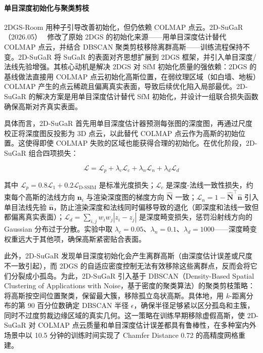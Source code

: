 \paragraph{单目深度初始化与聚类剪枝}

2DGS-Room 用种子引导改善初始化，但仍依赖 COLMAP 点云。2D-SuGaR（2026.05）~\cite{2605_00569} 修改了原始 2DGS 的初始化来源——用单目深度估计替代 COLMAP 点云，并结合 DBSCAN 聚类剪枝移除离群高斯——训练流程保持不变。2D-SuGaR 将 SuGaR 的表面对齐思想扩展到 2DGS 框架，并引入单目深度/法线先验增强。其核心动机是解决 2DGS 对 SfM 初始化质量的强依赖：2DGS 的基线做法直接用 COLMAP 点云初始化高斯位置，在弱纹理区域（如白墙、地板）COLMAP 产生的点云稀疏且偏离真实表面，导致后续优化陷入局部最优。2D-SuGaR 的解决方案是用单目深度估计替代 SfM 初始化，并设计一组联合损失函数确保高斯对齐真实表面。

具体而言，2D-SuGaR 首先用单目深度估计器预测每张图的深度图，再通过尺度校正将深度图反投影为 3D 点云，以此替代 COLMAP 点云作为高斯的初始位置。这使得即使 COLMAP 失败的区域也能获得合理的初始化。在优化阶段，2D-SuGaR 组合四项损失：

\begin{equation}
    \mathcal{L} = \mathcal{L}_p + \lambda_c \mathcal{L}_c + \lambda_n \mathcal{L}_n + \lambda_d \mathcal{L}_d
\end{equation}

其中 $\mathcal{L}_p = 0.8 \mathcal{L}_1 + 0.2 \mathcal{L}_{\text{D-SSIM}}$ 是标准光度损失；$\mathcal{L}_c$ 是深度-法线一致性损失，约束每个高斯的法线方向 $\mathbf{n}_i$ 与渲染深度图的梯度方向 $\hat{\mathbf{N}}$ 一致；$\mathcal{L}_n = 1 - \hat{\mathbf{N}}^\top \hat{\mathbf{n}}$ 引入单目法线先验 $\hat{\mathbf{n}}$，防止渲染深度和法线同时偏移导致的退化（即深度和法线一致但都偏离真实表面）；$\mathcal{L}_d = \sum_{i,j} w_i w_j |z_i - z_j|$ 是深度畸变损失，惩罚沿射线方向的 Gaussian 分布过于分散。实验中取 $\lambda_c = 0.05$、$\lambda_n = 0.1$、$\lambda_d = 1000$——深度畸变权重远大于其他项，确保高斯紧密贴合表面。

此外，2D-SuGaR 发现单目深度初始化会产生离群高斯（由深度估计误差或尺度不一致引起），而 2DGS 的自适应密度控制无法有效移除这些离群点，反而会将它们分裂成小孤岛。为此，2D-SuGaR 引入基于 DBSCAN（Density-Based Spatial Clustering of Applications with Noise，基于密度的聚类算法）的聚类剪枝策略：将高斯按空间位置聚类，保留最大簇，移除孤立岛状高斯。具体地，用 $k$-距离分布的第 90 百分位数确定 DBSCAN 半径 $\epsilon$，确保半径足够紧以区分孤岛和主簇，同时不过度剪裁边缘区域的真实几何。这一策略在训练早期移除虚假高斯，使 2D-SuGaR 对 COLMAP 点云质量和单目深度估计误差都具有鲁棒性，在多种室内外场景中以 10.5 分钟的训练时间实现了 Chamfer Distance 0.72 的高精度网格重建。

